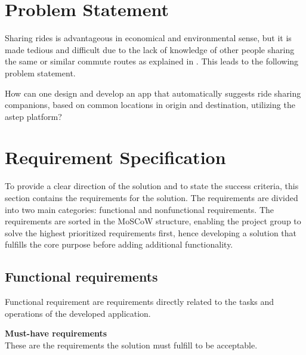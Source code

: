 \section{Problem Statement}
Sharing rides is advantageous in economical and environmental sense, but it is made tedious and difficult due to the lack of knowledge of other people sharing the same or similar commute routes as explained in \cite{doi:10.1080/01441647.2011.621557}. This leads to the following problem statement.

{\addtolength{\leftskip}{10mm}\addtolength{\rightskip}{10mm}\noindent\hrulefill\it

\noindent How can one design and develop an app that automatically suggests ride sharing companions, based on common locations in origin and destination, utilizing the \gls{astep} platform? 

\noindent\hrulefill

}

\DIFdelbegin {}\DIFdelend \DIFaddbegin {}

\DIFaddend \section{Requirement Specification}
To provide a clear direction of the solution and to state the success criteria, this section contains the requirements for the solution. 
The requirements are divided into two main categories: functional and nonfunctional requirements. 
The requirements are sorted in the MoSCoW structure, enabling the project group to solve the highest prioritized requirements first, hence developing a solution that fulfills the core purpose before adding additional functionality.


\subsection{Functional requirements}
Functional requirement are requirements directly related to the tasks and operations of the developed application.

\textbf{Must-have requirements}\\
These are the requirements the solution must fulfill to be acceptable.

